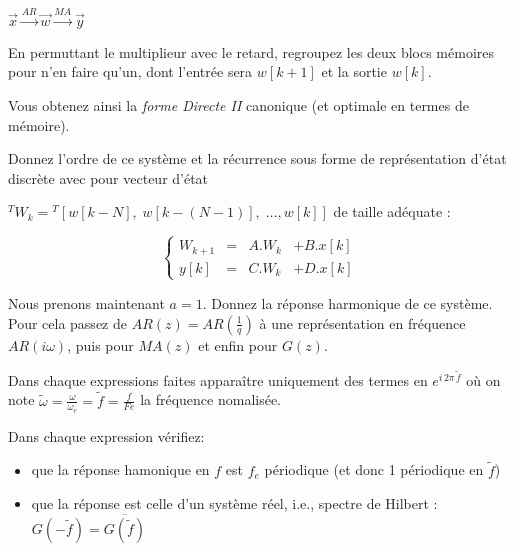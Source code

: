 $\vec{x} \overset{AR}{\longrightarrow} \vec{w} \overset{MA}{\longrightarrow} \vec{y}$


En permuttant le multiplieur avec le retard, regroupez les deux blocs mémoires pour n'en faire qu'un, dont l'entrée sera $w[k+1]$ et la sortie $w[k]$. 


Vous obtenez ainsi la \emph{forme Directe II} canonique (et optimale en termes de mémoire).


Donnez l'ordre de ce système et la récurrence sous forme de
représentation d'état discrète avec pour vecteur d'état

${}^T\!W_k = {}^T\![w[k-N], \;w[k-(N-1)], \;\ldots, w[k]]$ de taille adéquate :  

\begin{equation*}
  \left\{
    \begin{array}{cccc}
      W_{k+1} &=& A . W_k &+ B. x[k] \\
      y[k] &=& C . W_k &+  D. x[k]
    \end{array}\right.
\end{equation*}



Nous prenons maintenant $a=1$. Donnez la réponse harmonique de ce
système. Pour cela passez de $AR(z)=AR(\frac{1}{q})$ à une
représentation en fréquence $AR(i\omega)$, puis pour $MA(z)$ et enfin
pour $G(z)$.
 

Dans chaque  expressions faites apparaître uniquement des termes en $e^{i\,2\pi\,\tilde{f}}$ où on note $\tilde{\omega}=\frac{\omega}{\omega_e}=\tilde{f}=\frac{f}{Fe}$ la fréquence nomalisée.


Dans chaque expression vérifiez:  
\begin{itemize}
 \item que la réponse hamonique en $f$ est $f_e$ périodique (et donc 1 périodique en $\tilde{f}$)
 \item que la réponse est celle d'un système réel, i.e., spectre de Hilbert : $G(-\tilde{f})=\overline{G(\tilde{f})}$
 \end{itemize}

